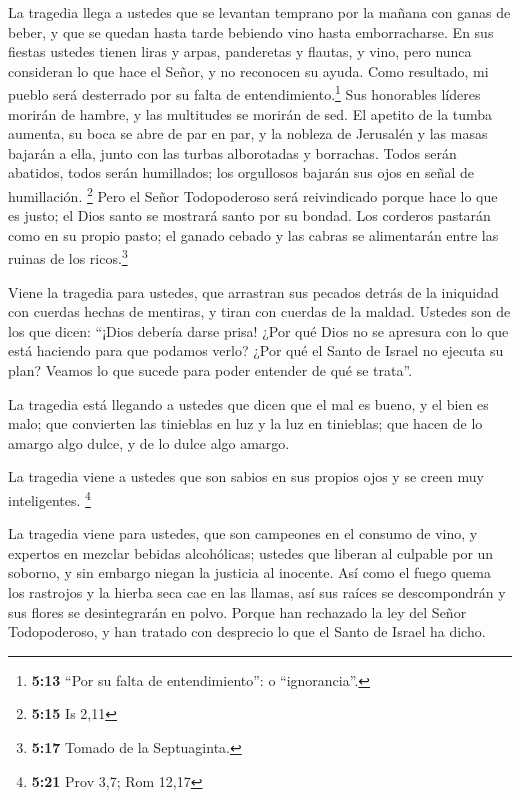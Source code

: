  La tragedia llega a ustedes que se levantan temprano por
la mañana con ganas de beber, y que se quedan hasta tarde bebiendo vino
hasta emborracharse.  En sus fiestas ustedes tienen liras
y arpas, panderetas y flautas, y vino, pero nunca consideran lo que hace
el Señor, y no reconocen su ayuda.  Como resultado, mi
pueblo será desterrado por su falta de entendimiento.\footnote{\textbf{5:13}
  ``Por su falta de entendimiento'': o ``ignorancia''.} Sus honorables
líderes morirán de hambre, y las multitudes se morirán de sed.
 El apetito de la tumba aumenta, su boca se abre de par
en par, y la nobleza de Jerusalén y las masas bajarán a ella, junto con
las turbas alborotadas y borrachas.  Todos serán
abatidos, todos serán humillados; los orgullosos bajarán sus ojos en
señal de humillación. \footnote{\textbf{5:15} Is 2,11} 
Pero el Señor Todopoderoso será reivindicado porque hace lo que es
justo; el Dios santo se mostrará santo por su bondad. 
Los corderos pastarán como en su propio pasto; el ganado cebado y las
cabras se alimentarán entre las ruinas de los ricos.\footnote{\textbf{5:17}
  Tomado de la Septuaginta.}

 Viene la tragedia para ustedes, que arrastran sus
pecados detrás de la iniquidad con cuerdas hechas de mentiras, y tiran
con cuerdas de la maldad.  Ustedes son de los que dicen:
``¡Dios debería darse prisa! ¿Por qué Dios no se apresura con lo que
está haciendo para que podamos verlo? ¿Por qué el Santo de Israel no
ejecuta su plan? Veamos lo que sucede para poder entender de qué se
trata''.

 La tragedia está llegando a ustedes que dicen que el mal
es bueno, y el bien es malo; que convierten las tinieblas en luz y la
luz en tinieblas; que hacen de lo amargo algo dulce, y de lo dulce algo
amargo.

 La tragedia viene a ustedes que son sabios en sus
propios ojos y se creen muy inteligentes. \footnote{\textbf{5:21} Prov
  3,7; Rom 12,17}

 La tragedia viene para ustedes, que son campeones en el
consumo de vino, y expertos en mezclar bebidas alcohólicas;
 ustedes que liberan al culpable por un soborno, y sin
embargo niegan la justicia al inocente.  Así como el
fuego quema los rastrojos y la hierba seca cae en las llamas, así sus
raíces se descompondrán y sus flores se desintegrarán en polvo. Porque
han rechazado la ley del Señor Todopoderoso, y han tratado con desprecio
lo que el Santo de Israel ha dicho.

